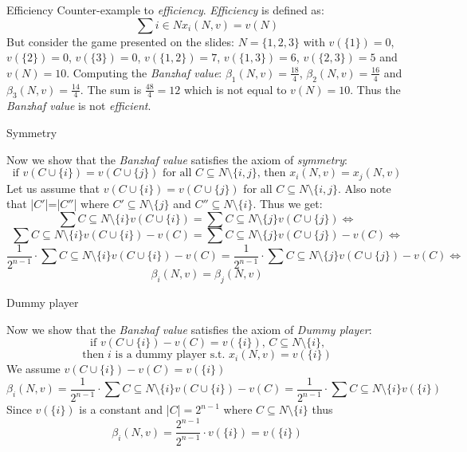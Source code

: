 \documentclass[12pt]{article}
\newenvironment{answer}[2][Answer]{\begin{trivlist}
\item[\hskip \labelsep {\bfseries #1}\hskip \labelsep {\bfseries #2:}]}{\end{trivlist}}
\begin{document}
\begin{answer}{a)}{Efficiency}
Counter-example to \textit{efficiency}. \textit{Efficiency} is defined as: \\
$$\sum{i \in N}{}{x_i(N,v)=v(N)}$$
But consider the game presented on the slides: $N=\{1,2,3\}$ with $v(\{1\})=0$, $v(\{2\})=0$, $v(\{3\})=0$, $v(\{1,2\})=7$, $v(\{1,3\})=6$, $v(\{2,3\})=5$ and $v(N)=10$. Computing the \textit{Banzhaf value}: $\beta_1(N,v)=\frac{18}{4}$, $\beta_2(N,v)=\frac{16}{4}$ and $\beta_3(N,v)=\frac{14}{4}$. The sum is $\frac{48}{4}=12$ which is not equal to $v(N)=10$. Thus the \textit{Banzhaf value} is not \textit{efficient}.

\end{answer}
\begin{answer}{b)}{Symmetry}

Now we show that the \textit{Banzhaf value} satisfies the axiom of \textit{symmetry}:
$$\text{if }v(C \cup \{i\}) = v(C \cup \{j\}) \text{ for all } C \subseteq N \setminus \{i,j\} \text{, then } x_i(N,v)=x_j(N,v)$$
Let us assume that $v(C \cup \{i\}) = v(C \cup \{j\})$ for all $C \subseteq N \setminus \{i,j\}$.
Also note that |$C'$|=|$C''$| where $C' \subseteq N \setminus \{j\}$ and $C'' \subseteq N \setminus \{i\}$. Thus we get:
$$\sum{C \subseteq N \setminus \{i\}}{}{v(C \cup \{i\})}=\sum{C \subseteq N \setminus \{j\}}{}{v(C \cup \{j\})} \Leftrightarrow$$
$$\sum{C \subseteq N \setminus \{i\}}{}{v(C \cup \{i\})-v(C)}=\sum{C \subseteq N \setminus \{j\}}{}{v(C \cup \{j\})-v(C)} \Leftrightarrow$$
$$\frac{1}{2^{n-1}}\cdot\sum{C \subseteq N \setminus \{i\}}{}{v(C \cup \{i\})-v(C)}=\frac{1}{2^{n-1}}\cdot \sum{C \subseteq N \setminus \{j\}}{}{v(C \cup \{j\})-v(C)} \Leftrightarrow$$
$$\beta_i(N,v)=\beta_j(N,v)$$

\end{answer}
\begin{answer}{c)}{Dummy player}

Now we show that the \textit{Banzhaf value} satisfies the axiom of \textit{Dummy player}:
$$\text{if } v(C \cup \{i\})-v(C)=v(\{i\}) \text{, }C \subseteq N \setminus \{i\}\text{,}$$
$$\text{then } i \text{ is a dummy player s.t. } x_i(N,v)=v(\{i\})$$
We assume $v(C \cup \{i\})-v(C)=v(\{i\})$
$$\beta_i(N,v)=\frac{1}{2^{n-1}}\cdot \sum{C \subseteq N \setminus \{i\}}{}{v(C \cup \{i\}) - v(C)}=\frac{1}{2^{n-1}}\cdot \sum{C \subseteq N \setminus \{i\}}{}{v(\{i\})}$$
Since $v(\{i\})$ is a constant and |$C$|$=2^{n-1}$ where $C \subseteq N \setminus \{i\}$ thus
$$\beta_i(N,v)=\frac{2^{n-1}}{2^{n-1}}\cdot v(\{i\})=v(\{i\})$$

\end{answer}
\end{document}
